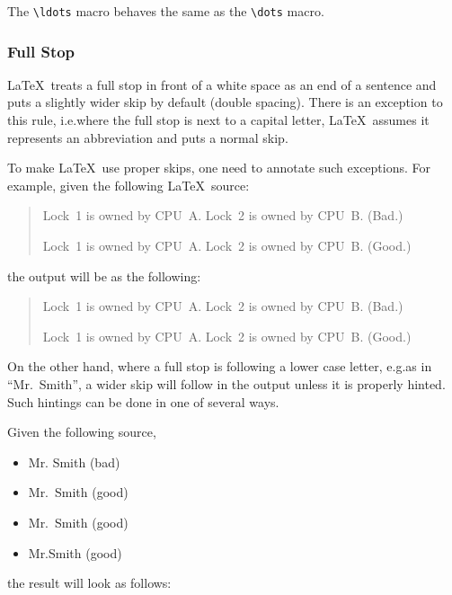 The \verb|\ldots| macro behaves the same as the \verb|\dots| macro.

\subsubsection{Full Stop}
\label{sec:app:styleguide:Full Stop}

\LaTeX\ treats a full stop in front of a white space as an end of
a sentence and puts a slightly wider skip by default (double spacing).
There is an exception to this rule, i.e.\@ where the full stop is next
to a capital letter, \LaTeX\ assumes it represents an abbreviation
and puts a normal skip.

To make \LaTeX\ use proper skips, one need to annotate such exceptions.
For example, given the following \LaTeX\ source:

\begin{VerbatimU}
\begin{quote}
	Lock~1 is owned by CPU~A.
	Lock~2 is owned by CPU~B.  (Bad.)

	Lock~1 is owned by CPU~A\@.
	Lock~2 is owned by CPU~B\@.  (Good.)
\end{quote}
\end{VerbatimU}
%
the output will be as the following:

\begin{quote}
	Lock~1 is owned by CPU~A.
	Lock~2 is owned by CPU~B.  (Bad.)

	Lock~1 is owned by CPU~A\@.
	Lock~2 is owned by CPU~B\@.  (Good.)
\end{quote}

On the other hand, where a full stop is following a lower case
letter, e.g.\@ as in ``Mr.~Smith'', a wider skip will follow
in the output unless it is properly hinted.
Such hintings can be done in one of several ways.

Given the following source,

\begin{VerbatimU}
\begin{itemize}[nosep]
	\item Mr. Smith (bad)
	\item Mr.~Smith (good)
	\item Mr.\ Smith (good)
	\item Mr.\@ Smith (good)
\end{itemize}
\end{VerbatimU}

\noindent%
the result will look as follows:


